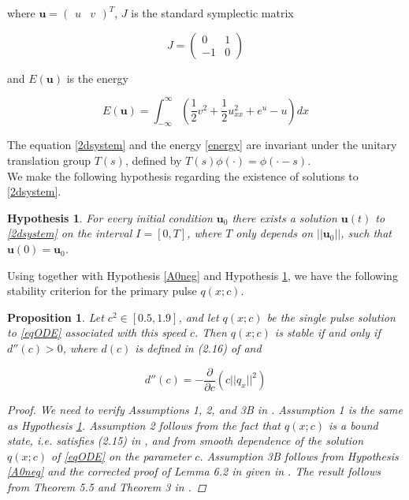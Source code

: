 \documentclass[12pt]{article}
\newtheorem{proposition}{Proposition}
\newtheorem{hypothesis}{Hypothesis}
\begin{document}
where $\textbf{u} = \begin{pmatrix}u&v\end{pmatrix}^T$, $J$ is the standard symplectic matrix

\begin{equation*}
J = \begin{pmatrix}0 & 1 \\ -1 & 0 \end{pmatrix}
\end{equation*}

and $E(\textbf{u})$ is the energy

\begin{equation}\label{energy}
E(\textbf{u}) = \int_{-\infty}^\infty \left(\frac{1}{2} v^2 + \frac{1}{2}u_{xx}^2 + e^{u} - u \right)dx
\end{equation}

The equation \eqref{2dsystem} and the energy \eqref{energy} are invariant under the unitary translation group $T(s)$, defined by $T(s)\phi(\cdot) = \phi(\cdot - s)$. \\

We make the following hypothesis regarding the existence of solutions to \eqref{2dsystem}.

\begin{hypothesis}\label{existhyp}
For every initial condition $\textbf{u}_0$ there exists a solution $\textbf{u}(t)$ to \eqref{2dsystem} on the interval $I = [0, T]$, where $T$ only depends on $||\textbf{u}_0||$, such that $\textbf{u}(0) = \textbf{u}_0$. 
\end{hypothesis}

Using \cite{Grillakis1987} together with Hypothesis \ref{A0neg} and Hypothesis \ref{existhyp}, we have the following stability criterion for the primary pulse $q(x; c)$. 

\begin{proposition}\label{stabcrit}
Let $c^2 \in [0.5, 1.9]$, and let $q(x; c)$ be the single pulse solution to \eqref{eqODE} associated with this speed $c$. Then $q(x; c)$ is stable if and only if $d''(c) > 0$, where $d(c)$ is defined in (2.16) of \cite{Grillakis1987} and 

\begin{equation}\label{dcc}
d''(c) = -\frac{\partial}{\partial c} \left( c ||q_x||^2 \right)
\end{equation}

\begin{proof}
We need to verify Assumptions 1, 2, and 3B in \cite{Grillakis1987}. Assumption 1 is the same as Hypothesis \ref{existhyp}. Assumption 2 follows from the fact that $q(x; c)$ is a bound state, i.e. satisfies (2.15) in \cite{Grillakis1987}, and from smooth dependence of the solution $q(x; c)$ of \eqref{eqODE} on the parameter $c$. Assumption 3B follows from Hypothesis \ref{A0neg} and the corrected proof of Lemma 6.2 in \cite{Grillakis1987} given in \cite{Grillakis1990}. The result follows from Theorem 5.5 and Theorem 3 in \cite{Grillakis1987}.

\end{proof}
\end{proposition}
\end{document}
